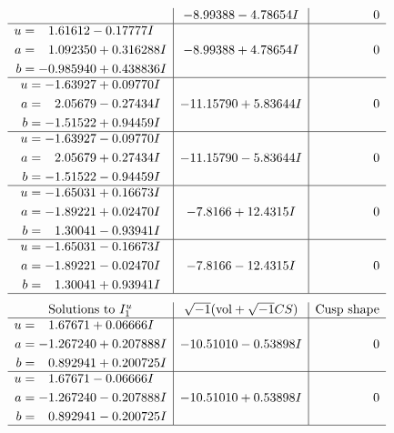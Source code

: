 \documentclass[1p]{elsarticle_modified}
\theoremstyle{definition}
\newcommand{\I}{\sqrt{-1}}
\begin{document}
$$\begin{array}{c|c|c}
 & -8.99388 - 4.78654 I & \phantom{-0.000000 } 0 \\ \hline\begin{aligned}
u &= \phantom{-}1.61612 - 0.17777 I \\
a &= \phantom{-}1.092350 + 0.316288 I \\
b &= -0.985940 + 0.438836 I\end{aligned}
 & -8.99388 + 4.78654 I & \phantom{-0.000000 } 0 \\ \hline\begin{aligned}
u &= -1.63927 + 0.09770 I \\
a &= \phantom{-}2.05679 - 0.27434 I \\
b &= -1.51522 + 0.94459 I\end{aligned}
 & -11.15790 + 5.83644 I & \phantom{-0.000000 } 0 \\ \hline\begin{aligned}
u &= -1.63927 - 0.09770 I \\
a &= \phantom{-}2.05679 + 0.27434 I \\
b &= -1.51522 - 0.94459 I\end{aligned}
 & -11.15790 - 5.83644 I & \phantom{-0.000000 } 0 \\ \hline\begin{aligned}
u &= -1.65031 + 0.16673 I \\
a &= -1.89221 + 0.02470 I \\
b &= \phantom{-}1.30041 - 0.93941 I\end{aligned}
 & -7.8166 + 12.4315 I & \phantom{-0.000000 } 0 \\ \hline\begin{aligned}
u &= -1.65031 - 0.16673 I \\
a &= -1.89221 - 0.02470 I \\
b &= \phantom{-}1.30041 + 0.93941 I\end{aligned}
 & -7.8166 - 12.4315 I & \phantom{-0.000000 } 0\\
 \hline 
 \end{array}$$\newpage$$\begin{array}{c|c|c}  
\text{Solutions to }I^u_{1}& \I (\text{vol} + \sqrt{-1}CS) & \text{Cusp shape}\\
 \hline 
\begin{aligned}
u &= \phantom{-}1.67671 + 0.06666 I \\
a &= -1.267240 + 0.207888 I \\
b &= \phantom{-}0.892941 + 0.200725 I\end{aligned}
 & -10.51010 - 0.53898 I & \phantom{-0.000000 } 0 \\ \hline\begin{aligned}
u &= \phantom{-}1.67671 - 0.06666 I \\
a &= -1.267240 - 0.207888 I \\
b &= \phantom{-}0.892941 - 0.200725 I\end{aligned}
 & -10.51010 + 0.53898 I & \phantom{-0.000000 } 0\\
 \hline 
 \end{array}$$\newpage\newpage\renewcommand{\arraystretch}{1}
\end{document}
